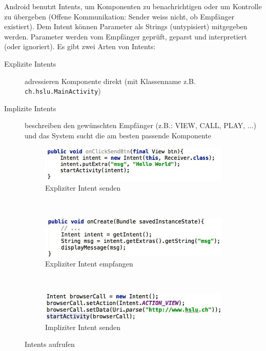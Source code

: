 Android benutzt Intents, um Komponenten zu benachrichtigen oder um Kontrolle zu übergeben (Offene Kommunikation: Sender weiss nicht, ob Empfänger existiert). Dem Intent können Parameter als Strings (untypisiert) mitgegeben werden. Parameter werden vom Empfänger geprüft, geparst und interpretiert (oder ignoriert). Es gibt zwei Arten von Intents:
\begin{description}
	\item[Explizite Intents] adressieren Komponente direkt (mit Klassenname z.B. \texttt{ch.hslu.MainActivity})  
	\item[Implizite Intents] beschreiben den gewünschten Empfänger (z.B.: VIEW, CALL, PLAY, ...) und das System sucht die am besten passende Komponente
\end{description}
\begin{figure}
	\centering
	\begin{subfigure}[b]{0.48\textwidth}
		\includegraphics[width=\textwidth]{fig/send-explizit-intent}
		\caption{Expliziter Intent senden}
		\label{fig:send-explizit-intent}
	\end{subfigure}
	~
	\begin{subfigure}[b]{0.48\textwidth}
		\includegraphics[width=\textwidth]{fig/receive-explizit-intent}
		\caption{Expliziter Intent empfangen}
		\label{fig:receive-explizit-intent}
	\end{subfigure}
	~
	\begin{subfigure}[b]{0.48\textwidth}
		\includegraphics[width=\textwidth]{fig/send-implizit-intent}
		\caption{Impliziter Intent senden}
		\label{fig:send-implizit-intent}
	\end{subfigure}
	\caption{Intents aufrufen}
\end{figure}
